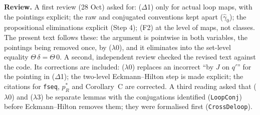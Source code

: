 \documentclass[11pt]{amsart}
\theoremstyle{definition}
\theoremstyle{remark}
\newcommand{\code}[1]{\texttt{#1}}
\begin{document}
\noindent\textbf{Review.} A first review (28 Oct) asked for: ($\Delta$1) only for
actual loop maps, with the pointings explicit; the raw and conjugated
conventions kept apart ($\hat\gamma_0$); the propositional eliminations explicit
(Step 4); (F2) at the level of maps, not classes. The present text follows
these: the argument is pointwise in both variables, the pointings being removed
once, by ($\lambda$0), and it eliminates into the set-level equality
$\Theta\,\delta=\Theta\,0$. A second, independent review checked the revised
text against the code. Its corrections are included: ($\lambda$0) replaces an
incorrect ``by $J$ on $q'$'' for the pointing in ($\Delta$1); the two-level
Eckmann--Hilton step is made explicit; the citations for \code{fseq}, $p_R^*$
and Corollary~C are corrected. A third reading asked that ($\lambda$0) and
($\lambda$3) be separate lemmas with the conjugations identified
(\code{LoopConj}) before Eckmann--Hilton removes them; they were
formalised first (\code{CrossDeloop}).
\end{document}

